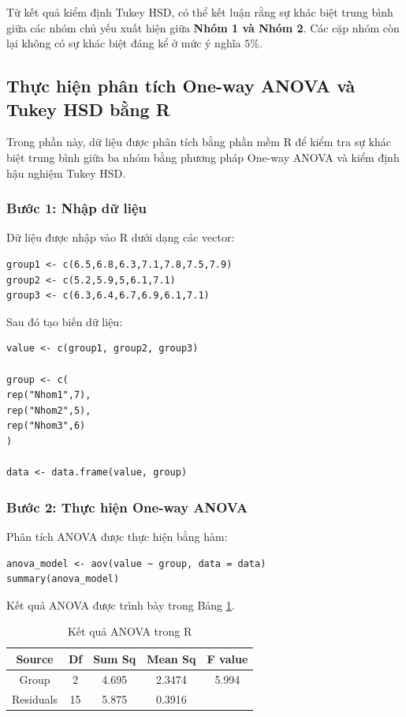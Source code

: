 Từ kết quả kiểm định Tukey HSD, có thể kết luận rằng sự khác biệt trung bình
giữa các nhóm chủ yếu xuất hiện giữa \textbf{Nhóm 1 và Nhóm 2}.
Các cặp nhóm còn lại không có sự khác biệt đáng kể ở mức ý nghĩa $5\%$.

\subsection{Thực hiện phân tích One-way ANOVA và Tukey HSD bằng R}

Trong phần này, dữ liệu được phân tích bằng phần mềm R để kiểm tra
sự khác biệt trung bình giữa ba nhóm bằng phương pháp One-way ANOVA
và kiểm định hậu nghiệm Tukey HSD.

\subsubsection*{Bước 1: Nhập dữ liệu}

Dữ liệu được nhập vào R dưới dạng các vector:

\begin{verbatim}
group1 <- c(6.5,6.8,6.3,7.1,7.8,7.5,7.9)
group2 <- c(5.2,5.9,5,6.1,7.1)
group3 <- c(6.3,6.4,6.7,6.9,6.1,7.1)
\end{verbatim}

Sau đó tạo biến dữ liệu:

\begin{verbatim}
value <- c(group1, group2, group3)

group <- c(
rep("Nhom1",7),
rep("Nhom2",5),
rep("Nhom3",6)
)

data <- data.frame(value, group)
\end{verbatim}

\subsubsection*{Bước 2: Thực hiện One-way ANOVA}

Phân tích ANOVA được thực hiện bằng hàm:

\begin{verbatim}
anova_model <- aov(value ~ group, data = data)
summary(anova_model)
\end{verbatim}

Kết quả ANOVA được trình bày trong Bảng \ref{tab:r_anova}.

\begin{table}[!htp]
\centering
\caption{Kết quả ANOVA trong R}
\label{tab:r_anova}
\begin{tabular}{|c|c|c|c|c|}
\hline
Source & Df & Sum Sq & Mean Sq & F value \\
\hline
Group & 2 & 4.695 & 2.3474 & 5.994 \\
Residuals & 15 & 5.875 & 0.3916 & \\
\hline
\end{tabular}
\end{table}


